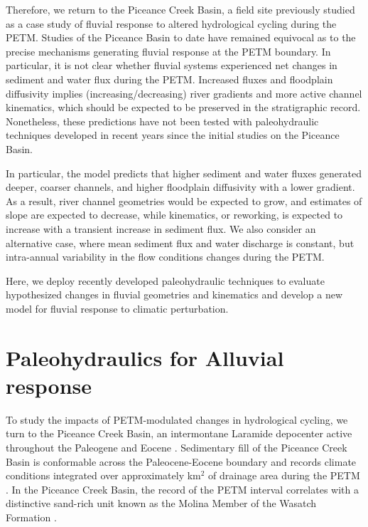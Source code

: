 \documentclass[draft]{compact_proposal}
\newcommand{\del}[3]{\ce{\delta^#1#2_{#3}}}
\begin{document}
Therefore, we return to the Piceance Creek Basin, a field site previously studied as a case study of fluvial response to altered hydrological cycling during the PETM.
Studies of the Piceance Basin to date  have remained equivocal as to the precise mechanisms generating fluvial response at the PETM boundary.
In particular, it is not clear whether fluvial systems experienced net changes in sediment and water flux during the PETM.
Increased fluxes and floodplain diffusivity implies (increasing/decreasing) river gradients and more active channel kinematics, which should be expected to be preserved in the stratigraphic record.
Nonetheless, these predictions have not been tested with paleohydraulic techniques developed in recent years since the initial studies on the Piceance Basin.

In particular, the \cnote[BZF] model predicts that higher sediment and water fluxes generated deeper, coarser channels, and higher floodplain diffusivity with a lower gradient.
As a result, river channel geometries would be expected to grow, and estimates of slope are expected to decrease, while kinematics, or reworking, is expected to increase with a transient increase in sediment flux.
We also consider an alternative case, where mean sediment flux and water discharge is constant, but intra-annual variability in the flow conditions changes during the PETM.

Here, we deploy recently developed paleohydraulic techniques to evaluate hypothesized changes in fluvial geometries and kinematics and develop a new model for fluvial response to climatic perturbation.

\section{Paleohydraulics for Alluvial response}


To study the impacts of PETM-modulated changes in hydrological cycling, we turn to the Piceance Creek Basin, an intermontane Laramide depocenter active throughout the Paleogene and Eocene \cnote.
Sedimentary fill of the Piceance Creek Basin is conformable across the Paleocene-Eocene boundary and records climate conditions integrated over approximately  km$^2$ of drainage area during the PETM \cnote.
In the Piceance Creek Basin, the \del{13}{C}{org} record of the PETM interval correlates with a distinctive sand-rich unit known as the Molina Member of the Wasatch Formation \cnote[bzf].
\end{document}
